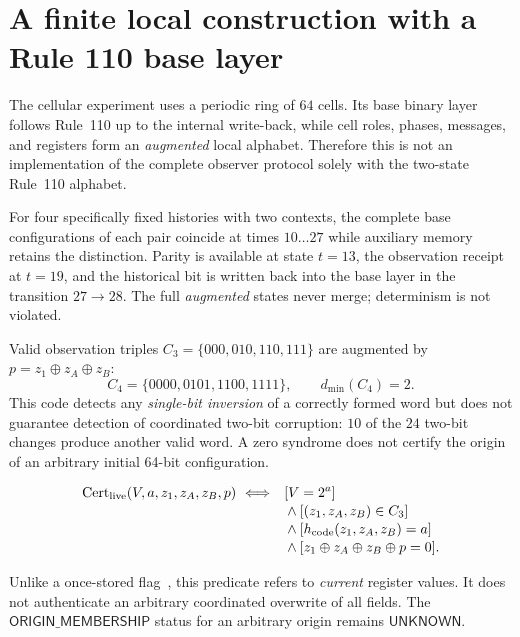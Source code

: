 \documentclass[11pt,a4paper]{article}
\newcommand{\vstatus}[1]{\textsf{#1}}
\begin{document}
\section{A finite local construction with a Rule 110 base layer}

The cellular experiment uses a periodic ring of $64$ cells. Its base binary layer follows Rule~110 up to the internal write-back, while cell roles, phases, messages, and registers form an \emph{augmented} local alphabet. Therefore this is not an implementation of the complete observer protocol solely with the two-state Rule~110 alphabet.

For four specifically fixed histories with two contexts, the complete base configurations of each pair coincide at times $10\ldots27$ while auxiliary memory retains the distinction. Parity is available at state $t=13$, the observation receipt at $t=19$, and the historical bit is written back into the base layer in the transition $27\to28$. The full \emph{augmented} states never merge; determinism is not violated.

Valid observation triples $C_3=\{000,010,110,111\}$ are augmented by $p=z_1\oplus z_A\oplus z_B$:
\begin{equation}\label{eq:code}
C_4=\{0000,0101,1100,1111\},\qquad d_{\min}(C_4)=2.
\end{equation}
This code detects any \emph{single-bit inversion} of a correctly formed word but does not guarantee detection of coordinated two-bit corruption: $10$ of the $24$ two-bit changes produce another valid word. A zero syndrome does not certify the origin of an arbitrary initial 64-bit configuration.

\begin{equation}\label{eq:live}
\begin{aligned}
\mathrm{Cert}_{\rm live}(V,a,z_1,z_A,z_B,p)\ \Longleftrightarrow\quad
 &[V=2^a]\\[-2pt]
 &\land[(z_1,z_A,z_B)\in C_3]\\[-2pt]
 &\land[h_{\rm code}(z_1,z_A,z_B)=a]\\[-2pt]
 &\land[z_1\oplus z_A\oplus z_B\oplus p=0].
\end{aligned}
\end{equation}

Unlike a once-stored flag~\cite{leucker2009}, this predicate refers to \emph{current} register values. It does not authenticate an arbitrary coordinated overwrite of all fields. The $\vstatus{ORIGIN\_MEMBERSHIP}$ status for an arbitrary origin remains $\vstatus{UNKNOWN}$.
\end{document}
